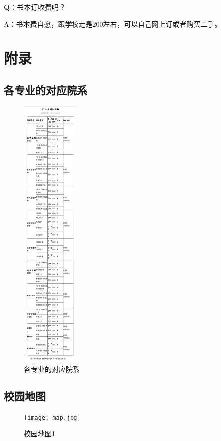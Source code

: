 \documentclass[12pt]{article} %
\begin{document}
\textbf{Q}：书本订收费吗？

A：书本费自愿，跟学校走是200左右，可以自己网上订或者购买二手。








		\newpage
\section{附录} 
	\subsection{各专业的对应院系}
		\begin{figure}[!h]
		\centering
		\includegraphics[width=0.25\textwidth]{mingdan.jpg}
		\caption{各专业的对应院系}
	\end{figure}
			\newpage
	
	\subsection{校园地图}
	\begin{figure}[!h]
	\centering
	\texttt{[image: map.jpg]}
	\caption{校园地图1}
\end{figure}
\end{document}

